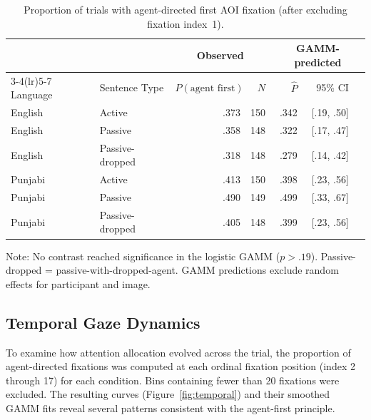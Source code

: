 \documentclass[12pt, a4paper]{article}
\begin{document}
\begin{table}[h]
\centering
\caption{Proportion of trials with agent-directed first AOI fixation
         (after excluding fixation index~1).}
\label{tab:first_look}
\begin{threeparttable}
\begin{tabular}{llrrrrr}
\toprule
& & \multicolumn{2}{c}{Observed} & \multicolumn{3}{c}{GAMM-predicted} \\
\cmidrule(lr){3-4}\cmidrule(lr){5-7}
Language & Sentence Type & $P(\text{agent first})$ & $N$ & $\hat{P}$ & 95\% CI \\
\midrule
English & Active                & .373 & 150 & .342 & [.19, .50] \\
English & Passive               & .358 & 148 & .322 & [.17, .47] \\
English & Passive-dropped       & .318 & 148 & .279 & [.14, .42] \\
Punjabi & Active                & .413 & 150 & .398 & [.23, .56] \\
Punjabi & Passive               & .490 & 149 & .499 & [.33, .67] \\
Punjabi & Passive-dropped       & .405 & 148 & .399 & [.23, .56] \\
\bottomrule
\end{tabular}
\begin{tablenotes}
\footnotesize
\item Note: No contrast reached significance in the logistic GAMM ($p > .19$).
      Passive-dropped = passive-with-dropped-agent.
      GAMM predictions exclude random effects for participant and image.
\end{tablenotes}
\end{threeparttable}
\end{table}

\subsection{Temporal Gaze Dynamics}

To examine how attention allocation evolved across the trial, the proportion
of agent-directed fixations was computed at each ordinal fixation position
(index 2 through 17) for each condition.
Bins containing fewer than 20 fixations were excluded.
The resulting curves (Figure~\ref{fig:temporal}) and their smoothed GAMM fits
reveal several patterns consistent with the agent-first principle.
\end{document}
